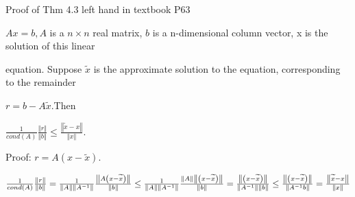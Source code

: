 \documentclass{article}
\begin{document}
Proof of Thm 4.3 left hand in textbook P63

$Ax=b,A$ is a $n\times n$ real matrix, $b$ is a n-dimensional column vector,
x is the solution of this linear

equation. Suppose $\widetilde{x}$ is the approximate solution to the
equation, corresponding to the remainder 

$r=b-A\widetilde{x}.$Then 

$\frac{1}{cond(A)}\frac{\left\Vert r\right\Vert }{\left\Vert b\right\Vert }%
\leq \frac{\left\Vert \widetilde{x}-x\right\Vert }{\left\Vert x\right\Vert }.
$

Proof: $r=A\left( x-\widetilde{x}\right) .$

$\frac{1}{cond(A)}\frac{\left\Vert r\right\Vert }{\left\Vert b\right\Vert }=%
\frac{1}{\left\Vert A\right\Vert \left\Vert A^{-1}\right\Vert }\frac{%
\left\Vert A\left( x-\widetilde{x}\right) \right\Vert }{\left\Vert
b\right\Vert }\leq \frac{1}{\left\Vert A\right\Vert \left\Vert
A^{-1}\right\Vert }\frac{\left\Vert A\right\Vert \left\Vert \left( x-%
\widetilde{x}\right) \right\Vert }{\left\Vert b\right\Vert }=\frac{%
\left\Vert \left( x-\widetilde{x}\right) \right\Vert }{\left\Vert
A^{-1}\right\Vert \left\Vert b\right\Vert }\leq \frac{\left\Vert \left( x-%
\widetilde{x}\right) \right\Vert }{\left\Vert A^{-1}b\right\Vert }=\frac{%
\left\Vert \widetilde{x}-x\right\Vert }{\left\Vert x\right\Vert }$
\end{document}

